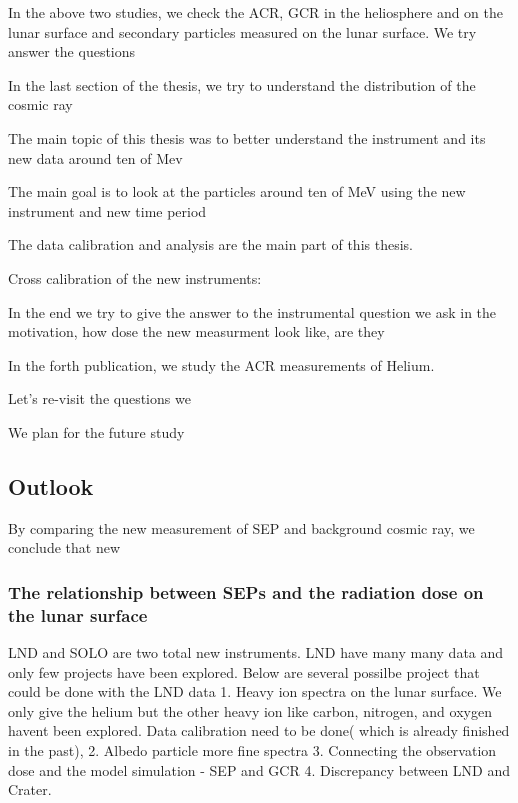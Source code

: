 In the above two studies, we check the \ac{ACR}, \ac{GCR} in the heliosphere and on the lunar surface and secondary particles measured on the lunar surface.   We try answer the questions





In the last section of the thesis, we try to understand the distribution of the cosmic ray


The main topic of this thesis was to better understand the instrument and its new data around ten of Mev

The main goal is to look at the particles around ten of MeV using the new instrument and new time period

The data calibration and analysis are the main part of this thesis. 

Cross calibration of the new instruments:


In the end we try to give the answer to the instrumental question we ask in the motivation, how dose the new measurment look like, are they 


In the forth publication, we study the ACR measurements of Helium.

Let's re-visit the questions we 


We plan for the future study


\subsection*{Outlook}

By comparing the new measurement of \ac{SEP} and background cosmic ray, we conclude that new 



\subsubsection*{The relationship between SEPs and the radiation dose on the lunar surface}

LND and SOLO are two total new instruments.
LND have many many data and only few projects have been explored.
Below are several possilbe project that could be done with the LND data
1. Heavy ion spectra on the lunar surface. We only give the helium but the other heavy ion like carbon, nitrogen, and oxygen havent been explored. Data calibration need to be done( which is already finished in the past), 
2. Albedo particle more fine spectra
3. Connecting the observation dose and the model simulation - SEP and GCR
4. Discrepancy between LND and Crater.


